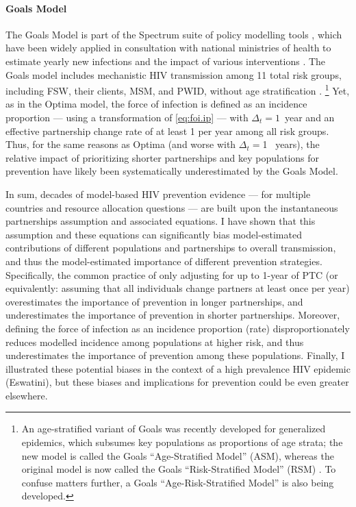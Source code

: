 \paragraph{Goals Model}\cite{Stover2014,Stover2021}
The Goals Model is part of the Spectrum suite of policy modelling tools \cite{Spectrum2022},
which have been widely applied in consultation with national ministries of health
to estimate yearly new infections and the impact of various interventions \cite{Stover2021}.
The Goals model includes mechanistic HIV transmission among 11 total risk groups, including
FSW, their clients, MSM, and PWID, without age stratification \cite{Stover2014}.%
\footnote{An age-stratified variant of Goals was recently developed for generalized epidemics,
  which subsumes key populations as proportions of age strata;
  the new model is called the Goals ``Age-Stratified Model'' (ASM), whereas
  the original model is now called the Goals ``Risk-Stratified Model'' (RSM) \cite{Stover2021}.
  To confuse matters further, a Goals ``Age-Risk-Stratified Model'' is also being developed.}
Yet, as in the Optima model, the force of infection is defined as an incidence proportion
--- using a transformation of \eqref{eq:foi.ip} --- with $\Delta_t = 1$~year
and an effective partnership change rate of at least 1 per year among all risk groups.
Thus, for the same reasons as Optima (and worse with $\Delta_t = {}$1 ~years),
the relative impact of prioritizing shorter partnerships and key populations for prevention
have likely been systematically underestimated by the Goals Model.
\par
In sum, decades of model-based HIV prevention evidence
--- for multiple countries and resource allocation questions ---
are built upon the instantaneous partnerships assumption and associated equations.
I have shown that this assumption and these equations can significantly bias
model-estimated contributions of different populations and partnerships to overall transmission,
and thus the model-estimated importance of different prevention strategies.
Specifically, the common practice of only adjusting for up to 1-year of PTC
(or equivalently: assuming that all individuals change partners at least once per year)
overestimates the importance of prevention in longer partnerships, and
underestimates the importance of prevention in shorter partnerships.
Moreover, defining the force of infection as an incidence proportion (\vs rate)
disproportionately reduces modelled incidence among populations at higher risk,
and thus underestimates the importance of prevention among these populations.
Finally, I illustrated these potential biases
in the context of a high prevalence HIV epidemic (Eswatini),
but these biases and implications for prevention could be even greater elsewhere.
